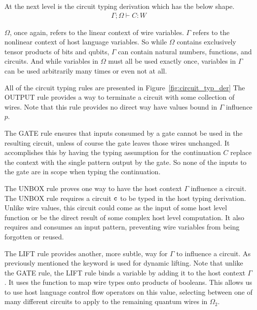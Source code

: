 At the next level is the circuit typing derivation which has the below shape.
\begin{align*}
\Gamma;\Omega \vdash C : W
\end{align*}

$\Omega$, once again, refers to the linear context of wire variables.
$\Gamma$ refers to the nonlinear context of host language variables.
So while $\Omega$ contains exclusively tensor products of bits and qubits, $\Gamma$ can contain natural numbers, functions, and circuits.
And while variables in $\Omega$ must all be used exactly once, variables in $\Gamma$ can be used arbitrarily many times or even not at all.


All of the circuit typing rules are presented in Figure~\ref{fig:circuit_typ_der}
The OUTPUT rule provides a way to terminate a circuit with some collection of wires.
Note that this rule provides no direct way have values bound in $\Gamma$ influence $p$. 

The GATE rule ensures that inputs consumed by a gate cannot be used in the resulting circuit, unless of course the gate leaves those wires unchanged.
It accomplishes this by having the typing assumption for the continuation $C$ replace the context with the single pattern output by the gate.
So none of the inputs to the gate are in scope when typing the continuation.

The UNBOX rule proves one way to have the host context $\Gamma$ influence a circuit.
The UNBOX rule requires a circuit $\texttt{c}$ to be typed in the host typing derivation.
Unlike wire values, this circuit could come as the input of some host level function or be the direct result of some complex host level computation.
It also requires and consumes an input pattern, preventing wire variables from being forgotten or reused.

The LIFT rule provides another, more subtle, way for $\Gamma$ to influence a circuit.
As previously mentioned the  keyword is used for dynamic lifting. 
Note that unlike the GATE rule, the LIFT rule binds a variable by adding it to the host context $\Gamma$.
It uses the \coqfont{|$\cdot$|} function to map wire types onto products of booleans.
This allows us to use host language control flow operators on this value, selecting between one of many different circuits to apply to the remaining quantum wires in $\Omega_2$.

